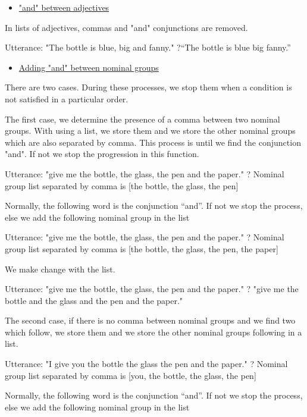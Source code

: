 \documentclass[twoside,a4paper,10pt]{report}
\newcommand{\dokuunderline}[1]{\underline{#1}}
\newcommand{\dokuitem}{\item}
\begin{document}
\begin{itemize}
\dokuitem  \dokuunderline{"and" between adjectives}
\end{itemize}
In lists of adjectives, commas and "and" conjunctions are removed.


\small
\begin{verbatimtab}
  Utterance: "The bottle is blue, big and fanny."
  ?“The bottle is blue big fanny.”
\end{verbatimtab}
\normalsize

\begin{itemize}
\dokuitem  \dokuunderline{Adding "and" between nominal groups}
\end{itemize}
There are two cases. During these processes, we stop them when a condition is not satisfied in a particular order.

The first case, we determine the presence of a comma between two nominal groups. With using a list, we store them and we store the other nominal groups which are also separated by comma. This process is until we find the conjunction "and". If not we stop the progression in this function. 


\small
\begin{verbatimtab}
  Utterance: "give me the bottle, the glass, the pen and the paper." 
  ? Nominal group list separated by comma is [the bottle, the glass, the pen]
\end{verbatimtab}
\normalsize
Normally, the following word is the conjunction “and”. If not we stop the process, else we add the following nominal group in the list


\small
\begin{verbatimtab}
  Utterance: "give me the bottle, the glass, the pen and the paper." 
  ? Nominal group list separated by comma is [the bottle, the glass, the pen, the paper]
\end{verbatimtab}
\normalsize
We make change with the list.


\small
\begin{verbatimtab}
  Utterance: "give me the bottle, the glass, the pen and the paper." 
  ? "give me the bottle and the glass and the pen and the paper." 
\end{verbatimtab}
\normalsize

The second case, if there is no comma between nominal groups and we find two which follow, we store them and we store the other nominal groups following in a list. 


\small
\begin{verbatimtab}
  Utterance: "I give you the bottle the glass the pen and the paper." 
  ? Nominal group list separated by comma is [you, the bottle, the glass, the pen]
\end{verbatimtab}
\normalsize
Normally, the following word is the conjunction “and”. If not we stop the process, else we add the following nominal group in the list
\end{document}
